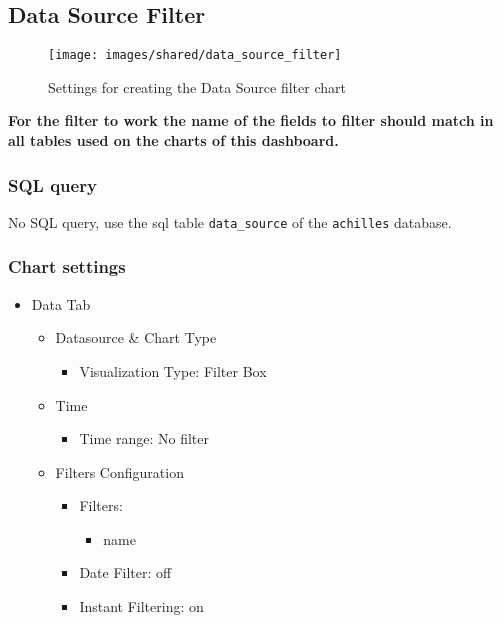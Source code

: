 \documentclass[
]{book}
\providecommand{\tightlist}{%
  \setlength{\itemsep}{0pt}\setlength{\parskip}{0pt}}
\begin{document}
\hypertarget{data-source-filter}{%
\subsection*{Data Source Filter}\label{data-source-filter}}

\begin{figure}
\texttt{[image: images/shared/data\_source\_filter]} \caption{Settings for creating the Data Source filter chart}\label{fig:dataSourceFilter}
\end{figure}

\textbf{For the filter to work the name of the fields to filter should match in all tables used on the charts of this dashboard.}

\hypertarget{sql-query}{%
\subsubsection*{SQL query}\label{sql-query}}

No SQL query, use the sql table \texttt{data\_source} of the \texttt{achilles} database.

\hypertarget{chart-settings}{%
\subsubsection*{Chart settings}\label{chart-settings}}

\begin{itemize}
\tightlist
\item
  Data Tab

  \begin{itemize}
  \tightlist
  \item
    Datasource \& Chart Type

    \begin{itemize}
    \tightlist
    \item
      Visualization Type: Filter Box
    \end{itemize}
  \item
    Time

    \begin{itemize}
    \tightlist
    \item
      Time range: No filter
    \end{itemize}
  \item
    Filters Configuration

    \begin{itemize}
    \tightlist
    \item
      Filters:

      \begin{itemize}
      \tightlist
      \item
        name
      \end{itemize}
    \item
      Date Filter: off
    \item
      Instant Filtering: on
    \end{itemize}
  \end{itemize}
\end{itemize}
\end{document}
